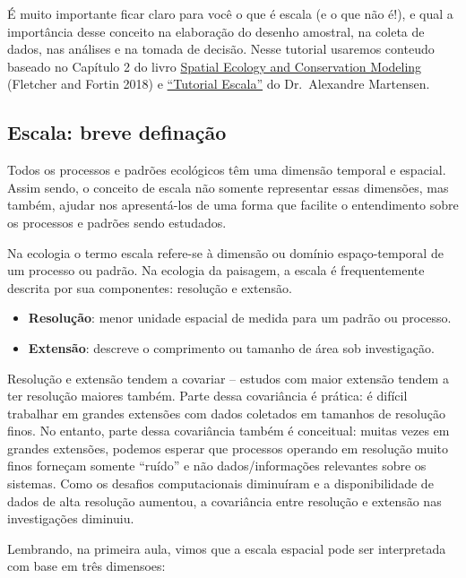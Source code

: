 \documentclass[
]{article}
\providecommand{\tightlist}{%
  \setlength{\itemsep}{0pt}\setlength{\parskip}{0pt}}
\begin{document}
É muito importante ficar claro para você o que é escala (e o que não é!), e qual a importância desse conceito na elaboração do desenho amostral, na coleta de dados, nas análises e na tomada de decisão. Nesse tutorial usaremos conteudo baseado no Capítulo 2 do livro \href{https://doi.org/10.1007/978-3-030-01989-1}{Spatial Ecology and Conservation Modeling} (Fletcher and Fortin 2018) e \href{https://www.needs.ufscar.br/tutorial_escala.pdf}{``Tutorial Escala''} do Dr.~Alexandre Martensen.

\hypertarget{escala-breve-definauxe7uxe3o}{%
\subsection{Escala: breve definação}\label{escala-breve-definauxe7uxe3o}}

Todos os processos e padrões ecológicos têm uma dimensão temporal e espacial. Assim sendo, o conceito de escala não somente representar essas dimensões, mas também, ajudar nos apresentá-los de uma forma que facilite o entendimento sobre os processos e padrões sendo estudados.

Na ecologia o termo escala refere-se à dimensão ou domínio espaço-temporal de um processo ou padrão. Na ecologia da paisagem, a escala é frequentemente descrita por sua componentes: resolução e extensão.

\begin{itemize}
\tightlist
\item
  \textbf{Resolução}: menor unidade espacial de medida para um padrão ou processo.
\item
  \textbf{Extensão}: descreve o comprimento ou tamanho de área sob investigação.
\end{itemize}

Resolução e extensão tendem a covariar -- estudos com maior extensão tendem a ter resolução maiores também. Parte dessa covariância é prática: é difícil trabalhar em grandes extensões com dados coletados em tamanhos de resolução finos. No entanto, parte dessa covariância também é conceitual: muitas vezes em grandes extensões, podemos esperar que processos operando em resolução muito finos forneçam somente ``ruído'' e não dados/informações relevantes sobre os sistemas. Como os desafios computacionais diminuíram e a disponibilidade de dados de alta resolução aumentou, a covariância entre resolução e extensão nas investigações diminuiu.

Lembrando, na primeira aula, vimos que a escala espacial pode ser interpretada com base em três dimensoes:
\end{document}

